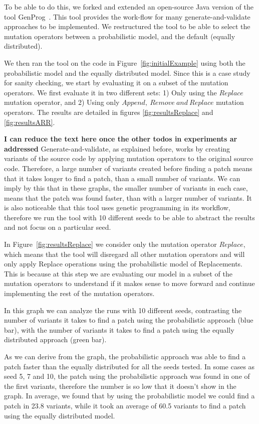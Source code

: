 \documentclass[conference]{IEEEtran}
\newcommand{\todo}[1]
  {{\scriptsize \textbf{\color{red} {#1}}}}
\begin{document}
To be able to do this, we forked and extended an open-source Java version of the 
tool GenProg~\cite{legoues2012}. This tool provides the work-flow 
for many generate-and-validate approaches to be implemented. We restructured the 
tool to be able to select the mutation operators between a 
probabilistic model, and the default (equally distributed).

We then ran the tool on the code in Figure~\ref{fig:initialExample} using both 
the probabilistic model and the equally distributed model. Since this is a 
case study for sanity checking, we start by evaluating it on a subset of 
the mutation operators. We first evaluate it in two different sets: 1) Only using the $Replace$ mutation operator, and 2) Using only $Append,~
Remove~and~Replace$ mutation operators. The results are detailed in figures 
\ref{fig:resultsReplace} and \ref{fig:resultsARR}. 

\todo{I can reduce the text here once the other todos in experiments ar addressed}
Generate-and-validate, as explained before, works by creating variants of the 
source code by applying mutation operators to the original source code. 
Therefore, a large number of variants created before finding a patch means that 
it takes longer to find a patch, than a small number of variants. We can imply by this 
that in these graphs, the smaller number of variants in each case, means that 
the patch was found faster, than with a larger number of variants. It is also 
noticeable that this tool uses genetic programming in its workflow, therefore we 
run the tool with 10 different seeds to be able to abstract the results 
and not focus on a particular seed.

In Figure~\ref{fig:resultsReplace} we consider only the mutation operator 
$Replace$, which means that the tool will disregard all other mutation 
operators and will only apply Replace operations using the probabilistic model 
of Replacements. This is because at this step we are evaluating our model in a 
subset of the mutation operators to understand if it makes sense to move forward and 
continue implementing the rest of the mutation operators.

In this graph we can analyze the runs with 10 different seeds, contrasting the 
number of variants it takes to find a patch using the probabilistic approach 
(blue bar), with the number of variants it takes to find a patch using the 
equally distributed approach (green bar). 

As we can derive from the graph, the probabilistic approach was able to find a 
patch faster than the equally distributed for all the seeds tested. In some 
cases as seed 5, 7 and 10, the patch using the probabilistic approach was found 
in one of the first variants, therefore the number is so low that it doesn't 
show in the graph. In average, we found that by using the probabilistic model we 
could find a patch in 23.8 variants, while it took an average of 60.5 variants 
to find a patch using the equally distributed model.
\end{document}
